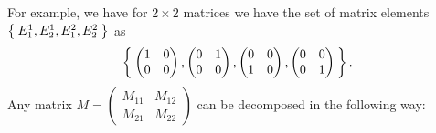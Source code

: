 \documentclass[10pt,a4paper]{article}
\begin{document}
	For example, we have for $2\times 2$ matrices we have the set of matrix elements $\Set{E_1^1,E_2^1,E_1^2,E_2^2}$ as 
	\begin{equation}
	\Set{\begin{pmatrix}
		1 & 0 \\ 0 & 0 
		\end{pmatrix},
		\begin{pmatrix}
		0 & 1 \\ 0 & 0 
		\end{pmatrix},
		\begin{pmatrix}
		0 & 0 \\ 1 & 0 
		\end{pmatrix},
		\begin{pmatrix}
		0 & 0 \\ 0 & 1 
		\end{pmatrix}}.
	\end{equation}
	Any matrix $M=\begin{pmatrix}	M_{11} & M_{12} \\ M_{21}&  M_{22} \end{pmatrix}$ can be decomposed in the following way:
	
\end{document}
